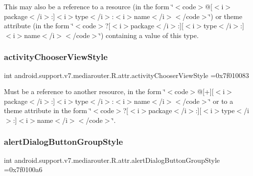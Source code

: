 This may also be a reference to a resource (in the form \char`\"{}$<$code$>$@\mbox{[}$<$i$>$package$<$/i$>$\+:\mbox{]}$<$i$>$type$<$/i$>$\+:$<$i$>$name$<$/i$>$$<$/code$>$\char`\"{}) or theme attribute (in the form \char`\"{}$<$code$>$?\mbox{[}$<$i$>$package$<$/i$>$\+:\mbox{]}\mbox{[}$<$i$>$type$<$/i$>$\+:\mbox{]}$<$i$>$name$<$/i$>$$<$/code$>$\char`\"{}) containing a value of this type. \mbox{\label{classandroid_1_1support_1_1v7_1_1mediarouter_1_1R_1_1attr_ac8d39d5de178b7d6b845652c6e5f23c4}} 
\subsubsection{\texorpdfstring{activity\+Chooser\+View\+Style}{activityChooserViewStyle}}
{\footnotesize\ttfamily int android.\+support.\+v7.\+mediarouter.\+R.\+attr.\+activity\+Chooser\+View\+Style =0x7f010083\hspace{0.3cm}{\ttfamily [static]}}

Must be a reference to another resource, in the form \char`\"{}$<$code$>$@\mbox{[}+\mbox{]}\mbox{[}$<$i$>$package$<$/i$>$\+:\mbox{]}$<$i$>$type$<$/i$>$\+:$<$i$>$name$<$/i$>$$<$/code$>$\char`\"{} or to a theme attribute in the form \char`\"{}$<$code$>$?\mbox{[}$<$i$>$package$<$/i$>$\+:\mbox{]}\mbox{[}$<$i$>$type$<$/i$>$\+:\mbox{]}$<$i$>$name$<$/i$>$$<$/code$>$\char`\"{}. \mbox{\label{classandroid_1_1support_1_1v7_1_1mediarouter_1_1R_1_1attr_a5abc9f8681fe2ef897c9686b07af82ea}} 
\subsubsection{\texorpdfstring{alert\+Dialog\+Button\+Group\+Style}{alertDialogButtonGroupStyle}}
{\footnotesize\ttfamily int android.\+support.\+v7.\+mediarouter.\+R.\+attr.\+alert\+Dialog\+Button\+Group\+Style =0x7f0100a6\hspace{0.3cm}{\ttfamily [static]}}

